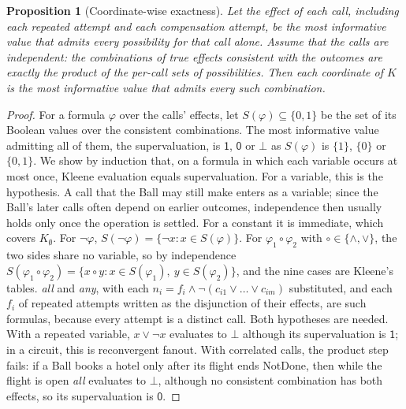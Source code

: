 \documentclass[11pt]{article}
\theoremstyle{definition}
\theoremstyle{plain}
\newtheorem{proposition}{Proposition}
\newcommand{\NotDone}{\textsf{NotDone}}
\newcommand{\yes}{\mathsf{1}}
\newcommand{\no}{\mathsf{0}}
\newcommand{\mayb}{\bot}
\begin{document}
\begin{proposition}[Coordinate-wise exactness]
\label{prop:exact}
Let the effect of each call, including each repeated attempt and each compensation attempt, be the most informative value that admits every possibility for that call alone. Assume that the calls are \emph{independent}: the combinations of true effects consistent with the outcomes are exactly the product of the per-call sets of possibilities. Then each coordinate of $K$ is the most informative value that admits every such combination.
\end{proposition}
\begin{proof}
For a formula $\varphi$ over the calls' effects, let $S(\varphi)\subseteq\{0,1\}$ be the set of its Boolean values over the consistent combinations. The most informative value admitting all of them, the supervaluation, is $\yes$, $\no$ or $\mayb$ as $S(\varphi)$ is $\{1\}$, $\{0\}$ or $\{0,1\}$. We show by induction that, on a formula in which each variable occurs at most once, Kleene evaluation equals supervaluation. For a variable, this is the hypothesis. A call that the Ball may still make enters as a variable; since the Ball's later calls often depend on earlier outcomes, independence then usually holds only once the operation is settled. For a constant it is immediate, which covers $K_\emptyset$. For $\neg\varphi$, $S(\neg\varphi)=\{\neg x : x\in S(\varphi)\}$. For $\varphi_1\circ\varphi_2$ with $\circ\in\{\wedge,\vee\}$, the two sides share no variable, so by independence $S(\varphi_1\circ\varphi_2)=\{x\circ y : x\in S(\varphi_1),\ y\in S(\varphi_2)\}$, and the nine cases are Kleene's tables. \emph{all} and \emph{any}, with each $n_i = f_i\wedge\neg(c_{i1}\vee\dots\vee c_{im})$ substituted, and each $f_i$ of repeated attempts written as the disjunction of their effects, are such formulas, because every attempt is a distinct call. Both hypotheses are needed. With a repeated variable, $x\vee\neg x$ evaluates to $\mayb$ although its supervaluation is $\yes$; in a circuit, this is reconvergent fanout. With correlated calls, the product step fails: if a Ball books a hotel only after its flight ends \NotDone, then while the flight is open \emph{all} evaluates to $\mayb$, although no consistent combination has both effects, so its supervaluation is $\no$.
\end{proof}
\end{document}

